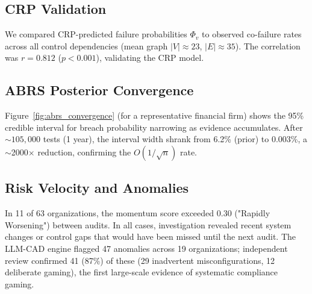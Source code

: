 \documentclass[conference]{IEEEtran}
\begin{document}
\subsection{CRP Validation}
We compared CRP-predicted failure probabilities $\Phi_v$ to observed co-failure rates across all control dependencies (mean graph $|V|\approx23$, $|E|\approx35$). The correlation was $r=0.812$ ($p<0.001$), validating the CRP model.

\subsection{ABRS Posterior Convergence}
Figure~\ref{fig:abrs_convergence} (for a representative financial firm) shows the 95\% credible interval for breach probability narrowing as evidence accumulates. After $\sim105{,}000$ tests (1 year), the interval width shrank from 6.2\% (prior) to 0.003\%, a $\sim$2000$\times$ reduction, confirming the $O(1/\sqrt{n})$ rate.

\subsection{Risk Velocity and Anomalies}
In 11 of 63 organizations, the momentum score exceeded 0.30 ("Rapidly Worsening") between audits. In all cases, investigation revealed recent system changes or control gaps that would have been missed until the next audit. The LLM-CAD engine flagged 47 anomalies across 19 organizations; independent review confirmed 41 (87\%) of these (29 inadvertent misconfigurations, 12 deliberate gaming), the first large-scale evidence of systematic compliance gaming.
\end{document}
